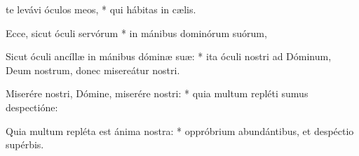 \begin{psalmus}

	 te levávi óculos meos, * qui hábitas in cælis.

	Ecce, sicut óculi servórum * in mánibus dominórum suórum,

	Sicut óculi ancíllæ in mánibus dóminæ suæ: * ita óculi nostri ad Dóminum, Deum nostrum, donec misereátur nostri.

	Miserére nostri, Dómine, miserére nostri: * quia multum repléti sumus despectióne:

	Quia multum repléta est ánima nostra: * oppróbrium abundántibus, et despéctio supérbis.

\end{psalmus}

